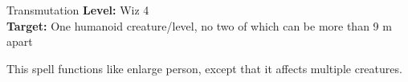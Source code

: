 {Transmutation}
{
	\textbf{Level:}
	Wiz 4\\
	\textbf{Target:}
	One humanoid creature/level, no two of which can be more than 9 m apart\\
}
{
	This spell functions like enlarge person, except that it affects multiple creatures.

}
